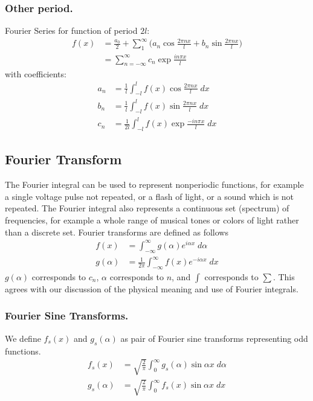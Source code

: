 \documentclass[../main.tex]{subfiles}
\begin{document}
\subsubsection*{Other period.} Fourier Series for function of period $2l$:
\begin{align*}
    f(x)&=\frac{a_0}{2}+\sum_{1}^{\infty}\bigg(a_n\cos \frac{2\pi nx}{l} +b_n\sin \frac{2\pi nx}{l}\bigg)\\
    &=\sum_{n=-\infty}^{\infty}c_n \exp\frac{in\pi x}{l}
\end{align*}
with coefficients:
\begin{align*}
    a_n&=\frac{1}{l}\int_{-l}^{l}  f(x)\cos \frac{2\pi nx}{l}\; dx\\
    b_n&=\frac{1}{l}\int_{-l}^{l}  f(x)\sin \frac{2\pi nx}{l} \;dx\\
    c_n&=\frac{1}{2l}\int_{-l}^{l}  f(x)\exp\frac{-in\pi x}{l} \;dx
\end{align*}

\subsection*{Fourier Transform}
The Fourier integral can be used to represent nonperiodic functions, for example a single voltage pulse not repeated, or a flash of light, or a sound which is not repeated. The Fourier integral also represents a continuous set (spectrum) of frequencies, for example a whole range of musical tones or colors of light rather than a discrete set. Fourier transforms are defined as follows
\begin{align*}
    f(x)&=\int_{-\infty}^{\infty }g(\alpha)e^{i\alpha x}\;d\alpha\\
    g(\alpha)&=\frac{1}{2\pi}\int_{-\infty}^{\infty }f(x)e^{-i\alpha x}\;dx
\end{align*}
$g(\alpha)$ corresponds to $c_n$, $\alpha$ corresponds to $n$, and $\int$ corresponds to $\sum $. This agrees with our discussion of the physical meaning and use of Fourier integrals.

\subsubsection*{Fourier Sine Transforms.} We define $f_s(x)$ and $g_s(\alpha)$ as pair of Fourier sine transforms representing odd functions.
\begin{align*}
    f_s(x)&=\sqrt{\frac{2}{\pi}}\int_{0}^{\infty }g_s(\alpha)\sin \alpha x\;d\alpha\\
    g_s(\alpha)&=\sqrt{\frac{2}{\pi}}\int_{0}^{\infty }f_s(x)\sin \alpha x\;dx
\end{align*}
\end{document}
